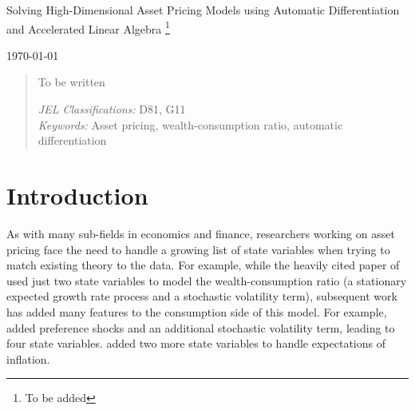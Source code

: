 \documentclass[12pt, reqno]{amsart}
\newcommand\blfootnote[1]{%
  \begingroup
  \renewcommand\thefootnote{}\footnote{#1}%
  \addtocounter{footnote}{-1}%
  \endgroup
}
\newcommand{\1}{\mathbbm 1}
\theoremstyle{plain}
\theoremstyle{definition}
\begin{document}
\title{}




\begin{center}
    \LARGE 
    Solving High-Dimensional Asset Pricing Models using Automatic
    Differentiation and Accelerated Linear Algebra
    \blfootnote{To be added}
 
    \vspace{1em}



    \normalsize
    \today
\end{center}


\begin{abstract}
    To be written
    \vspace{1em}

    \noindent
    \textit{JEL Classifications:} D81, G11 \\
    \textit{Keywords:} Asset pricing, wealth-consumption ratio, automatic differentiation
\end{abstract}





\maketitle


\section{Introduction}

As with many sub-fields in economics and finance, researchers working on asset
pricing face the need to handle a growing list of state variables when trying
to match existing theory to the data.  For example, while the heavily cited
paper of \cite{bansal2004risks} used just two state variables to model the
wealth-consumption ratio (a stationary expected growth rate process and a
stochastic volatility term), subsequent work has added many features to the
consumption side of this model.  For example,
\cite{schorfheide2018identifying} added preference shocks and an additional
stochastic volatility term, leading to four state variables.
\cite{gomez2021important} added two more state variables to handle
expectations of inflation.  
\end{document}
